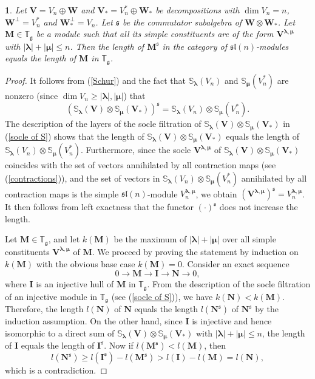 \documentclass[12pt,oneside,english]{amsart}
\numberwithin{equation}{section}
\numberwithin{figure}{section}
\theoremstyle{plain}
\theoremstyle{plain}
\newtheorem{lem}[thm]{\protect\lemmaname}
\theoremstyle{remark}
\theoremstyle{definition}
\theoremstyle{plain}
\theoremstyle{remark}
\theoremstyle{definition}
\theoremstyle{plain}
\theoremstyle{plain}
\theoremstyle{definition}
\providecommand{\lemmaname}{Lemma}
\newcommand{\bV}{\mathbf{V}}
\newcommand{\bI}{\mathbf{I}}
\newcommand{\bM}{\mathbf{M}}
\newcommand{\bN}{\mathbf{N}}
\newcommand{\bbW}{\mathbf{W}}
\newcommand{\fg}{\mathfrak{g}}
\newcommand{\fs}{\mathfrak{s}}
\begin{document}
\begin{lem}\label{aux0}  Let $\bV=V_n\oplus \bbW$ and $\bV_*=V_n^*\oplus\bbW_*$ be decompositions with $\dim V_n=n$,   $\bbW^\perp=V_n^*$ and $\bbW_*^\perp=V_n$.
Let $\fs$ be the commutator subalgebra of  $\bbW\otimes\bbW_*$.
 Let $\bM\in\mathbb T_{\fg}$ be a module such that all its simple constituents are of the form
  $\bV^{\boldsymbol{\lambda},{\boldsymbol{\mu}}}$ with $|\boldsymbol{\lambda}|+|{\boldsymbol{\mu}}|\leq n$. Then the length of $\bM^{\fs}$ in the category of $\mathfrak{sl}(n)$-modules equals the length of $\bM$ in
  $\mathbb T_{\fg}$.
\end{lem}
\begin{proof}
  It follows from (\ref{Schur}) and the fact that $\mathbb{S}_{\boldsymbol{\lambda}}(V_n)$ and $\mathbb{S}_{\boldsymbol{\mu}}(V_n^*)$ are nonzero  (since $\dim V_n\geq |\boldsymbol{\lambda}|,|\boldsymbol{\mu}|$) that
  $$(\mathbb{S}_{\boldsymbol{\lambda}}(\bV)\otimes \mathbb{S}_{\boldsymbol{\mu}}(\bV_*))^{\fs}=\mathbb{S}_{\boldsymbol{\lambda}}(V_n)\otimes \mathbb{S}_{\boldsymbol{\mu}}(V_n^*).$$
The description of the layers of the socle filtration of $\mathbb{S}_{\boldsymbol{\lambda}}(\bV)\otimes \mathbb{S}_{\boldsymbol{\mu}}(\bV_*)$ in (\ref{socle of S}) shows that
the length of $\mathbb{S}_{\boldsymbol{\lambda}}(\bV)\otimes \mathbb{S}_{\boldsymbol{\mu}}(\bV_*)$
  equals the length of $\mathbb{S}_{\boldsymbol{\lambda}}(V_n)\otimes \mathbb{S}_{\boldsymbol{\mu}}(V_n^*)$. Furthermore, since the socle $\bV^{\boldsymbol{\lambda},{\boldsymbol{\mu}}}$ of $\mathbb{S}_{\boldsymbol{\lambda}}(\bV)\otimes \mathbb{S}_{\boldsymbol{\mu}}(\bV_*)$ coincides with the set of vectors annihilated by all contraction maps (see (\ref{contractions})), and the set of vectors in $\mathbb{S}_{\boldsymbol{\lambda}}(V_n)\otimes \mathbb{S}_{\boldsymbol{\mu}}(V_n^*)$ annihilated by all contraction maps is the simple $\mathfrak{sl}(n)$-module  $V_n^{\boldsymbol{\lambda},{\boldsymbol{\mu}}}$, we obtain $(\bV^{\boldsymbol{\lambda},{\boldsymbol{\mu}}})^{\fs}=V_n^{\boldsymbol{\lambda},{\boldsymbol{\mu}}}$.  It then follows from left exactness that the functor
  $(\cdot)^\fs$  does not increase the length.

  Let $\bM\in\mathbb T_{\fg}$, and let $k(\bM)$ be the maximum of $|\boldsymbol{\lambda}|+|{\boldsymbol{\mu}}|$ over all simple constituents $\bV^{\boldsymbol{\lambda},{\boldsymbol{\mu}}}$ of $\bM$. We proceed by proving
  the statement by induction on $k(\bM)$ with the obvious base case $k(\bM)=0$. Consider an exact sequence
  $$0\to\bM\to \bI\to\bN \to 0,$$
  where $\bI$ is an injective hull of $\bM$ in $\mathbb T_{\fg}$. From the description of the socle filtration of an injective module in $\mathbb T_{\fg}$ (see (\ref{socle of S})), we have $k(\bN)<k(\bM)$. Therefore, the length $l(\bN)$ of $\bN$ equals the length $l(\bN^{\fs})$ of $\bN^{\fs}$ by the induction assumption. On the other hand, since $\bI$ is injective and hence isomorphic to a direct sum of $\mathbb{S}_{\boldsymbol{\lambda}}(\bV)\otimes \mathbb{S}_{\boldsymbol{\mu}}(\bV_*)$ with $|\boldsymbol{\lambda}|+|{\boldsymbol{\mu}}|\leq n$, the length of $\bI$ equals the length of $\bI^{\fs}$.  Now if $l(\bM^{\fs})<l(\bM)$, then
  $$l(\bN^{\fs})\geq l(\bI^{\fs})-l(\bM^{\fs})>l(\bI)-l(\bM)=l(\bN),$$
  which is a contradiction.
\end{proof}
\end{document}
